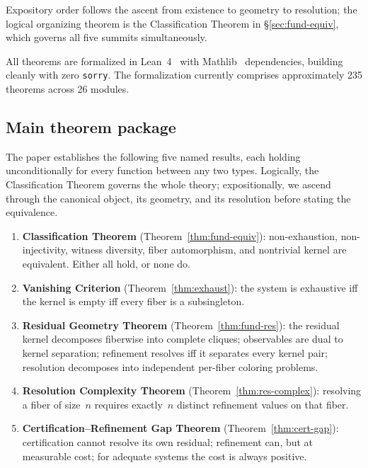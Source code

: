 \documentclass[11pt,a4paper]{article}
\theoremstyle{plain}
\theoremstyle{definition}
\theoremstyle{remark}
\begin{document}
\noindent
Expository order follows the ascent from existence to geometry to resolution;
the logical organizing theorem is the Classification Theorem in
\S\ref{sec:fund-equiv}, which governs all five summits simultaneously.

\noindent
All theorems are formalized in Lean~4~\cite{Lean4} with Mathlib~\cite{Mathlib} dependencies, building
cleanly with zero \texttt{sorry}. The formalization currently comprises approximately 235 theorems across 26 modules.

\subsection{Main theorem package}

The paper establishes the following five named results, each holding
unconditionally for every function between any two types. Logically, the
Classification Theorem governs the whole theory; expositionally, we ascend
through the canonical object, its geometry, and its resolution before
stating the equivalence.

\begin{enumerate}[label=(\Alph*),nosep]
\item \textbf{Classification Theorem}
      (Theorem~\ref{thm:fund-equiv}): non-exhaustion, non-injectivity, witness
      diversity, fiber automorphism, and nontrivial kernel are equivalent.
      Either all hold, or none do.
\item \textbf{Vanishing Criterion} (Theorem~\ref{thm:exhaust}): the system is
      exhaustive iff the kernel is empty iff every fiber is a subsingleton.
\item \textbf{Residual Geometry Theorem}
      (Theorem~\ref{thm:fund-res}): the residual kernel decomposes fiberwise
      into complete cliques; observables are dual to kernel separation;
      refinement resolves iff it separates every kernel pair; resolution
      decomposes into independent per-fiber coloring problems.
\item \textbf{Resolution Complexity Theorem}
      (Theorem~\ref{thm:res-complex}): resolving a fiber of size~$n$ requires
      exactly~$n$ distinct refinement values on that fiber.
\item \textbf{Certification--Refinement Gap Theorem}
      (Theorem~\ref{thm:cert-gap}): certification cannot resolve its own
      residual; refinement can, but at measurable cost; for adequate systems
      the cost is always positive.
\end{enumerate}
\end{document}
